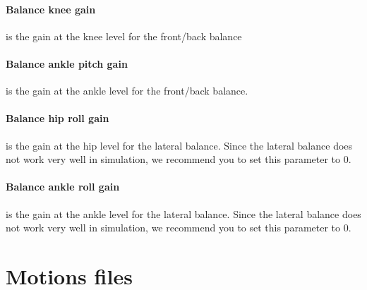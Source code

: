 \documentclass[a4paper, 12pt]{article}  		%
\begin{document}
\paragraph*{Balance knee gain}
is the gain at the knee level for the front/back balance

\paragraph*{Balance ankle pitch gain}
is the gain at the ankle level for the front/back balance.

\paragraph*{Balance hip roll gain}
is the gain at the hip level for the lateral balance. Since the lateral balance does not work very well in simulation, we recommend you to set this parameter to 0.

\paragraph*{Balance ankle roll gain}
is the gain at the ankle level for the lateral balance. Since the lateral balance does not work very well in simulation, we recommend you to set this parameter to 0.



\section{Motions files} \label{sec:Motions}
\end{document}
